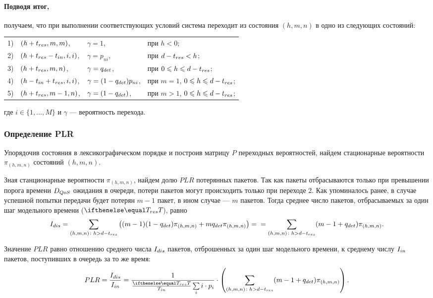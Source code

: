 \paragraph{Подводя итог,} получаем, что при выполнении соответствующих условий система  переходит из состояния $(h, m, n)$ в одно из следующих состояний:

\begin{tabular}{l l l l}
1)	&$(h + t_{res}, m, m)$,	&$\gamma = 1$,	&при $h < 0$;\\
2)	&$(h + t_{res} - t_{in}, i, i)$,	&$\gamma = p_{ni}$,	&при $d - t_{res}< h$;\\
3)	&$(h + t_{res}, m, n)$,	&$\gamma = q_{det}$,	&при $0 \leqslant h \leqslant d - t_{res}$;\\
4)	&$(h - t_{in} + t_{res}, i, i)$,	&$\gamma = ( 1 - q_{det}) p_{ni}$,	&при $m = 1$, $0 \leqslant h \leqslant d - t_{res}$;\\
5)	&$(h + t_{res}, m - 1, n)$,	&$\gamma = ( 1 - q_{det})$,	&при $m > 1$, $0 \leqslant h \leqslant d - t_{res}$;\\
\end{tabular} \newline
где $i\in\{1,\ldots,M\}$ и $\gamma$ --- вероятность перехода. 

\subsubsection{Определение PLR}
Упорядочив состояния в лексикографическом порядке и построив матрицу $P$ переходных вероятностей, найдем стационарные вероятности $\pi_{(h,m,n)}$ состояний $(h,m,n)$.

Зная станционарные вероятности $\pi_{(h,m, n)}$, найдем долю $PLR$ потерянных пакетов. Так как пакеты отбрасываются только при превышении порога времени $D_{QoS}$ ожидания в очереди, потери пакетов могут происходить только при переходе $2$. Как упоминалось ранее, в случае успешной попытки передачи будет потерян $m - 1$ пакет, в ином случае --- $m$ пакетов. Тогда среднее число пакетов, отбрасываемых за один шаг модельного времени ($\Tres$), равно
$$
	I_{dis} = \sum\limits_{(h,m, n)\colon h > d - t_{res}} \left((m - 1)(1 - q_{det})\pi_{(h,m,n)} + mq_{det}\pi_{(h,m,n)}\right) = \\
	=\sum\limits_{(h,m,n)\colon h > d - t_{res}} (m - 1 + q_{det})\pi_{(h,m,n)}.
$$

Значение $PLR$ равно отношению среднего числа $I_{dis}$ пакетов, отброшенных за один шаг модельного времени, к среднему числу $I_{in}$ пакетов, поступивших в очередь за то же время:
$$
PLR = \frac{\Idis}{\Iin} = \frac{1}{\frac{\Tres}{\Tin} \sum\limits_{i} i\cdot p_i} \cdot \left(\sum\limits_{(h,m,n)\colon h > d - \tres} (m - 1 + \qdet)\pi_{(h,m,n)} \right).
$$